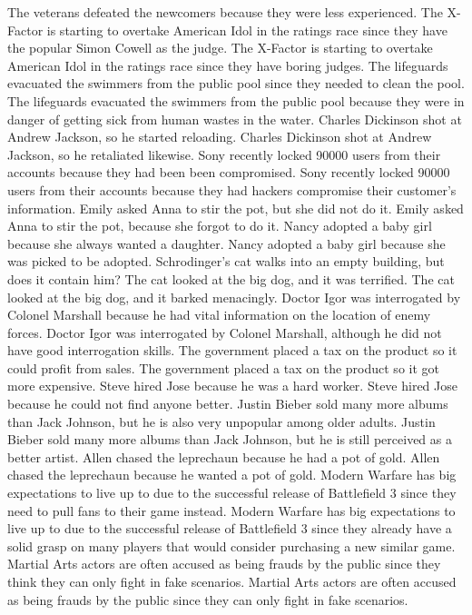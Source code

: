 \documentclass{article}
\begin{document}
\begin{enumerate}
The veterans defeated the newcomers because they were less experienced.
The X-Factor is starting to overtake American Idol in the ratings race since they have the popular Simon Cowell as the judge.
The X-Factor is starting to overtake American Idol in the ratings race since they have boring judges.
The lifeguards evacuated the swimmers from the public pool since they needed to clean the pool.
The lifeguards evacuated the swimmers from the public pool because they were in danger of getting sick from human wastes in the water.
Charles Dickinson shot at Andrew Jackson, so he started reloading.
Charles Dickinson shot at Andrew Jackson, so he retaliated likewise.
Sony recently locked 90000 users from their accounts because they had been been compromised.
Sony recently locked 90000 users from their accounts because they had hackers compromise their customer's information.
Emily asked Anna to stir the pot, but she did not do it.
Emily asked Anna to stir the pot, because she forgot to do it.
Nancy adopted a baby girl because she always wanted a daughter.
Nancy adopted a baby girl because she was picked to be adopted.
Schrodinger's cat walks into an empty building, but does it contain him?
The cat looked at the big dog, and it was terrified.
The cat looked at the big dog, and it barked menacingly.
Doctor Igor was interrogated by Colonel Marshall because he had vital information on the location of enemy forces.
Doctor Igor was interrogated by Colonel Marshall, although he did not have good interrogation skills.
The government placed a tax on the product so it could profit from sales.
The government placed a tax on the product so it got more expensive.
Steve hired Jose because he was a hard worker.
Steve hired Jose because he could not find anyone better.
Justin Bieber sold many more albums than Jack Johnson, but he is also very unpopular among older adults.
Justin Bieber sold many more albums than Jack Johnson, but he is still perceived as a better artist.
Allen chased the leprechaun because he had a pot of gold.
Allen chased the leprechaun because he wanted a pot of gold.
Modern Warfare has big expectations to live up to due to the successful release of Battlefield 3 since they need to pull fans to their game instead.
Modern Warfare has big expectations to live up to due to the successful release of Battlefield 3 since they already have a solid grasp on many players that would consider purchasing a new similar game.
Martial Arts actors are often accused as being frauds by the public since they think they can only fight in fake scenarios.
Martial Arts actors are often accused as being frauds by the public since they can only fight in fake scenarios.

\end{enumerate}
\end{document}
